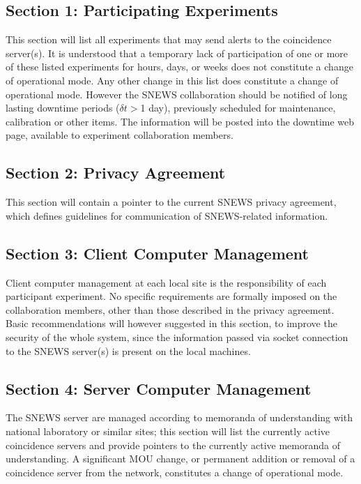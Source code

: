 \documentclass{article}
\begin{document}
\subsection*{Section 1: Participating Experiments}

This section will list all experiments that may send alerts to the
coincidence server(s).  It is understood that a temporary lack of
participation of one or more of these listed experiments for hours,
days, or weeks does not constitute a change of operational mode.  Any
other change in this list does constitute a change of operational
mode. However the SNEWS collaboration should be notified of long
lasting downtime periods ($\delta t>$1 day), previously scheduled for
maintenance, calibration or other items. The information will be
posted into the downtime web page, available to experiment collaboration
members.

\subsection*{Section 2: Privacy Agreement}
This section will contain a pointer to the current SNEWS privacy
agreement, which defines guidelines for communication
of SNEWS-related information.

\subsection*{Section 3: Client Computer Management}

Client computer management at each local site is the responsibility of
each participant experiment. No specific requirements are formally
imposed on the collaboration members, other than those described in
the privacy agreement. Basic recommendations will however suggested
in this section, to improve the security of the whole system, since the
information passed via socket connection to the SNEWS server(s) is
present on the local machines.


\subsection*{Section 4: Server Computer Management}

The SNEWS server are managed according to memoranda
of understanding with national laboratory or similar sites;
this section will list the currently active coincidence
servers and provide pointers to the currently active memoranda
of understanding.  A significant MOU change, or permanent addition
or removal of a coincidence server from the network,  
constitutes a change of operational mode.
\end{document}
